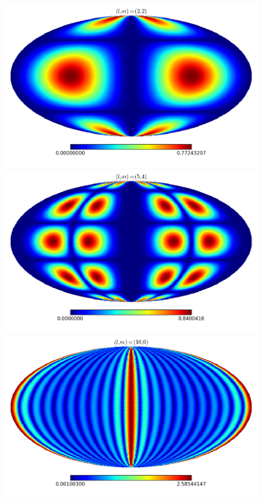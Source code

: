 \documentclass[11pt, a4paper,oneside,openright]{book}
\numberwithin{equation}{section}
\begin{document}
\begin{figure}
\begin{center}
\includegraphics[scale=0.3]{Fourier/(2,2).png}
\includegraphics[scale=0.3]{Fourier/(5,4).png}
\includegraphics[scale=0.3]{Fourier/(10,0).png}

\end{center}
\end{figure}
\end{document}
